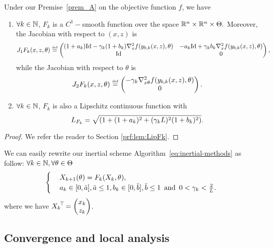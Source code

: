 \begin{lemma}\label{lem:LipFk} Under our Premise~\ref{prem_A} on the objective function $f$, we have  
\begin{enumerate}
\item $\forall k\in\mathbb{N}$, $F_k$ is a $C^1-$smooth function over the space $\mathbb{R}^n\times\mathbb{R}^n\times\Theta.$  
Moreover, the  Jacobian with respect to $(x,z)$ is
 	\begin{equation}\label{eq:Jac-xz}
	 	J_1F_k(x,z,\theta)\stackrel{\text{\rm\tiny def}}{=} \begin{pmatrix} (1+a_{k})\mathrm{Id}-\gamma_{k}(1+b_{k})\nabla_x^2f(y_{b,k}(x,z),\theta) &-a_{k}\mathrm{Id}+\gamma_{k}b_{k}\nabla_x^2f(y_{b,k}(x,z),\theta) \\ \mathrm{Id}  & 
		0\end{pmatrix},
	\end{equation}
	while the Jacobian with respect to $\theta$ is
	\begin{equation}\label{eq:Jac-theta}
	 	J_2F_k(x,z,\theta)\stackrel{\text{\rm\tiny def}}{=} \begin{pmatrix} -\gamma_{k}\nabla_{x\theta}^2f(y_{b,k}(x,z),\theta)  \\  
		0\end{pmatrix}.
	\end{equation}
\item $\forall k\in\mathbb{N}$, $F_k$ is also a Lipschitz continuous function with 
\begin{equation}\label{eq:L_F_k}
L_{F_k}= \sqrt{\left({1+(1+a_{k})^2+(\gamma_{k} L)^2(1+b_{k})^2}\right)}.
\end{equation}
\end{enumerate}
\end{lemma}
\begin{proof}
We refer the reader to Section \ref{prf:lem:LipFk}.
\end{proof}
We can easily rewrite our inertial scheme Algorithm~\ref{eq:inertial-methods} as follow: $\forall k \in\mathbb{N},\forall\theta\in\Theta$
\begin{equation}\label{eq:rewrite-scheme}
\begin{cases}
& X_{k+1}(\theta)=F_k(X_k,\theta),\\
& a_{k}\in[0,\bar{a}], \bar{a}\leq1, b_{k}\in[0,\bar{b}], \bar{b}\leq1\enskip \text{and} \enskip 0<\gamma_{k}<\frac{2}{L}.
\end{cases}
\end{equation}
where we have ${X_k}^{\!\top\!}=\begin{pmatrix}x_{k}\\{z}_{k}\end{pmatrix}$. 
\subsection{Convergence and local analysis}\label{subsec:conv-loc}

